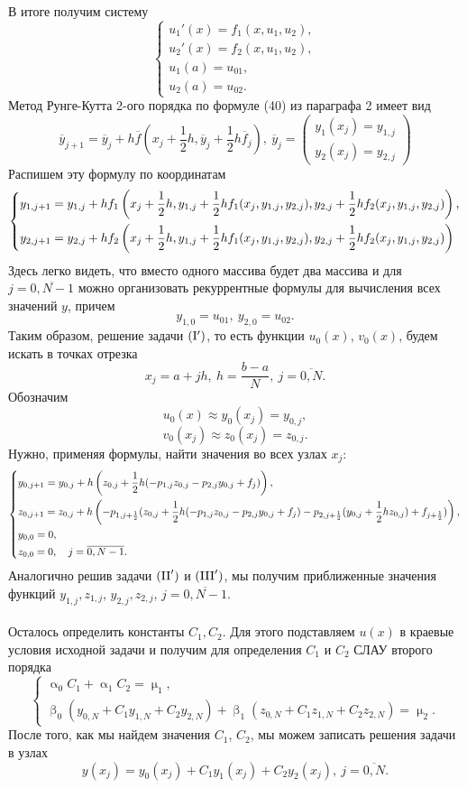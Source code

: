 \documentclass[a4paper, 12pt]{report}
\numberwithin{equation}{section}
\renewcommand{\alpha}{\upalpha}
\renewcommand{\beta}{\upbeta}
\renewcommand{\mu}{\upmu}
\begin{document}
	 В итоге получим систему 
	 $$
	 \begin{cases}
	 	u_1'(x) = f_1(x, u_1, u_2),\\
	 	u_2'(x) = f_2(x, u_1, u_2),\\
	 	u_1(a) = u_{01},\\
	 	u_2(a) = u_{02}.
	 \end{cases}
	 $$
	 Метод Рунге-Кутта 2-ого порядка по формуле (40) из параграфа 2 имеет вид 
	 $$\overline y_{j+1} = \overline y_j + h\overline f\left(x_j + \dfrac 12 h , \overline y_j + \dfrac 12 h \overline f_j\right),\ \overline y_j = \begin{pmatrix}
	 	y_1(x_j) = y_{1,j}\\
	 	y_2(x_j) = y_{2,j}
	 \end{pmatrix}$$
	 Распишем эту формулу по координатам
	 $$\begin{dcases}
	 	y_{1, j+1} = y_{1,j} + hf_1\left(x_j + \dfrac 12 h, y_{1,j} + \dfrac 12 hf_1(x_j, y_{1,j}, y_{2,j}), y_{2,j} + \dfrac12 h f_2(x_j, y_{1,j}, y_{2,j})\right),\\
	 	y_{2, j+1} = y_{2,j} + hf_2\left(x_j + \dfrac 12 h, y_{1,j} + \dfrac 12 hf_1(x_j, y_{1,j}, y_{2,j}), y_{2,j} + \dfrac12 h f_2(x_j, y_{1,j}, y_{2,j})\right)
	 \end{dcases}$$
	 Здесь легко видеть, что вместо одного массива будет два массива и для $j = \overline{0, N-1}$ можно организовать рекуррентные формулы для вычисления всех значений $y$, причем
	 $$y_{1,0} = u_{01},\ y_{2,0} = u_{02}.$$
	 Таким образом, решение задачи $(\rm{I}')$, то есть функции $u_0(x)$, $v_0(x)$, будем искать в точках отрезка $$x_j = a+jh,\ h = \dfrac{b-a}{N},\ j = \overline{0,N}.$$
	 Обозначим 
	 $$u_0(x) \approx y_0(x_j) = y_{0,j},$$
	 $$v_0(x_j) \approx z_0(x_j) = z_{0,j}.$$
	 Нужно, применяя формулы, найти значения во всех узлах $x_j$:
	 $$\begin{dcases}
	 	y_{0, j+1} = y_{0,j} + h\left(z_{0,j} + \dfrac12 h(-p_{1,j} z_{0,j} - p_{2,j}y_{0,j} + f_j)\right),\\
	 	z_{0,j+1} = z_{0,j} + h\left( -p_{1, j+\frac12}(z_{0,j} + \dfrac 12 h (-p_{1,j} z_{0,j} - p_{2,j} y_{0,j} + f_j) - p_{2, j+\frac12} (y_{0,j} + \dfrac12 hz_{0,j}) + f_{j+\frac12})\right),\\
	 	y_{0,0} = 0,\\
	 	z_{0,0} = 0,\quad j = \overline{0,N-1}.
	 \end{dcases}$$
	 Аналогично решив задачи $(\rm{II}')$ и $(\rm{III}')$, мы получим приближенные значения функций $y_{1,j}, z_{1,j}$, $y_{2,j}, z_{2,j}$, $j = \overline{0,N-1}$.\\\\
	 Осталось определить константы $C_1, C_2$. Для этого подставляем $u(x)$ в краевые условия исходной задачи и получим для определения $C_1$ и $C_2$ СЛАУ второго порядка
	 $$
	 \begin{cases}
	 	\alpha_0 C_1 + \alpha_1 C_2 = \mu _1,\\
	 	\beta_0 (y_{0,N} + C_1y_{1, N} + C_2 y_{2,N}) + \beta_1 (z_{0,N} + C_1z_{1, N} + C_2 z_{2,N}) = \mu_2.
	 \end{cases}
	 $$
	 После того, как мы найдем значения $C_1$, $C_2$, мы можем записать решения задачи в узлах $$y(x_j) = y_0(x_j) + C_1y_1(x_j) + C_2 y_2(x_j),\ j=\overline{0, N}.$$
\end{document}

